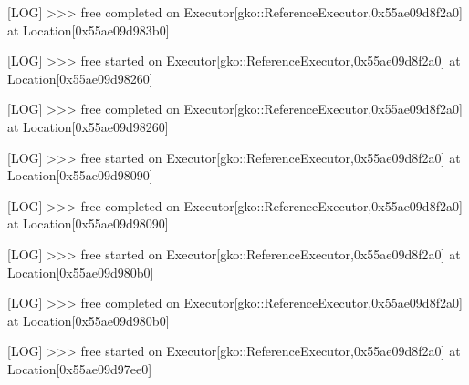 \begin{DoxyCode}
                                                               
[LOG] >>> free completed on Executor[gko::ReferenceExecutor,0x55ae09d8f2a0] at Location[0x55ae09d983b0]    
                                                                                                                  
                                                               
[LOG] >>> free started on Executor[gko::ReferenceExecutor,0x55ae09d8f2a0] at Location[0x55ae09d98260]      
                                                                                                                  
                                                               
[LOG] >>> free completed on Executor[gko::ReferenceExecutor,0x55ae09d8f2a0] at Location[0x55ae09d98260]    
                                                                                                                  
                                                               
[LOG] >>> free started on Executor[gko::ReferenceExecutor,0x55ae09d8f2a0] at Location[0x55ae09d98090]      
                                                                                                                  
                                                               
[LOG] >>> free completed on Executor[gko::ReferenceExecutor,0x55ae09d8f2a0] at Location[0x55ae09d98090]    
                                                                                                                  
                                                               
[LOG] >>> free started on Executor[gko::ReferenceExecutor,0x55ae09d8f2a0] at Location[0x55ae09d980b0]      
                                                                                                                  
                                                               
[LOG] >>> free completed on Executor[gko::ReferenceExecutor,0x55ae09d8f2a0] at Location[0x55ae09d980b0]    
                                                                                                                  
                                                               
[LOG] >>> free started on Executor[gko::ReferenceExecutor,0x55ae09d8f2a0] at Location[0x55ae09d97ee0]      
                                                                                                                  

\end{DoxyCode}
